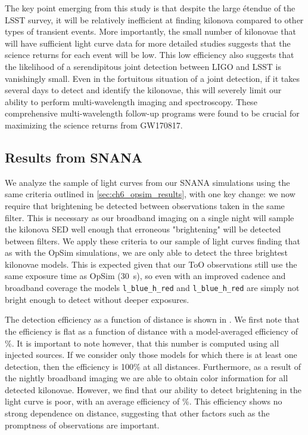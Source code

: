 The key point emerging from this study is that despite the large \'{e}tendue of the LSST survey, it will be relatively inefficient at finding kilonova compared to other types of transient events. More importantly, the small number of kilonovae that will have sufficient light curve data for more detailed studies suggests that the science returns for each event will be low. This low efficiency also suggests that the likelihood of a serendipitous joint detection between LIGO and LSST is vanishingly small. Even in the fortuitous situation of a joint detection, if it takes several days to detect and identify the kilonovae, this will severely limit our ability to perform multi-wavelength imaging and spectroscopy. These comprehensive multi-wavelength follow-up programs were found to be crucial for maximizing the science returns from GW170817.

\subsection{Results from SNANA}
\label{sec:ch6_snana_results}
We analyze the sample of light curves from our SNANA simulations using the same criteria outlined in \cref{sec:ch6_opsim_results}, with one key change: we now require that brightening be detected between observations taken in the same filter. This is necessary as our broadband imaging on a single night will sample the kilonova SED well enough that erroneous "brightening" will be detected between filters. We apply these criteria to our sample of light curves finding that as with the OpSim simulations, we are only able to detect the three brightest kilonovae models. This is expected given that our ToO observations still use the same exposure time as OpSim (30~s), so even with an improved cadence and broadband coverage the models {\tt l\_blue\_h\_red} and {\tt l\_blue\_h\_red} are simply not bright enough to detect without deeper exposures.

The detection efficiency as a function of distance is shown in . We first note that the efficiency is flat as a function of distance with a model-averaged efficiency of \%. It is important to note however, that this number is computed using all injected sources. If we consider only those models for which there is at least one detection, then the efficiency is 100\% at all distances. Furthermore, as a result of the nightly broadband imaging we are able to obtain color information for all detected kilonovae. However, we find that our ability to detect brightening in the light curve is poor, with an average efficiency of \%. This efficiency shows no strong dependence on distance, suggesting that other factors such as the promptness of observations are important.


